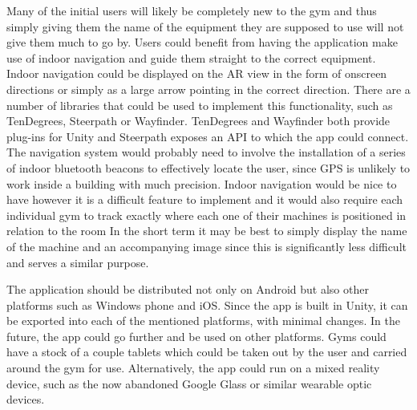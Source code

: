 \documentclass{l4proj}
\begin{document}
Many of the initial users will likely be completely new to the gym and thus simply giving them the name of the equipment they are supposed to use will not give them much to go by. Users could benefit from having the application make use of indoor navigation and guide them straight to the correct equipment. Indoor navigation could be displayed on the AR view in the form of onscreen directions or simply as a large arrow pointing in the correct direction. There are a number of libraries that could be used to implement this functionality, such as TenDegrees, Steerpath or Wayfinder. TenDegrees and Wayfinder both provide plug-ins for Unity and Steerpath exposes an API to which the app could connect. The navigation system would probably need to involve the installation of a series of indoor bluetooth beacons to effectively locate the user, since GPS is unlikely to work inside a building with much precision. Indoor navigation would be nice to have however it is a difficult feature to implement and it would also require each individual gym to track exactly where each one of their machines is positioned in relation to the room In the short term it may be best to simply display the name of the machine and an accompanying image since this is significantly less difficult and serves a similar purpose. 

The application should be distributed not only on Android but also other platforms such as Windows phone and iOS. Since the app is built in Unity, it can be exported into each of the mentioned platforms, with minimal changes. In the future, the app could go further and be used on other platforms. Gyms could have a stock of a couple tablets which could be taken out by the user and carried around the gym for use. Alternatively, the app could run on a mixed reality device, such as the now abandoned Google Glass or similar wearable optic devices. 
\end{document}

